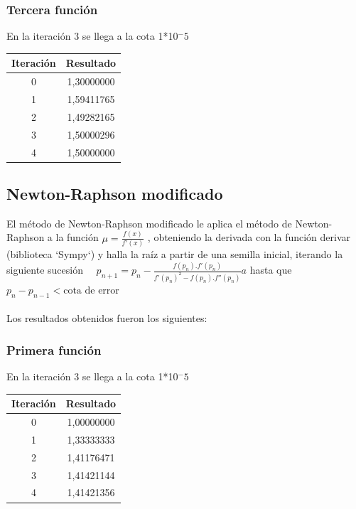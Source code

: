 \documentclass[titlepage,a4paper]{article}
\begin{document}
\subsubsection{Tercera función}\label{sec:NR3}
En la iteración 3 se llega a la cota 1*10$^-5$
\begin{center}
    \begin{tabular}{| c | c |}
    \hline
     Iteración & Resultado \\ \hline
        0     & 1,30000000 \\
        1     & 1,59411765 \\
        2     & 1,49282165 \\
        3     & 1,50000296 \\
        4     & 1,50000000 \\
    \hline
    \end{tabular}
\end{center}
\subsection{Newton-Raphson modificado}\label{sec:biseccion}

El método de Newton-Raphson modificado le aplica el método de Newton-Raphson a la función $\mu =\frac{f (x)}{f'(x)}$
, obteniendo la derivada con la función derivar (biblioteca `Sympy`) y halla la raíz a partir de una semilla inicial, iterando la siguiente sucesión
$
\quad p_{n+1}=p_n-\frac{f(p_n).f'(p_n)} {f'(p_n)^2-f(p_n).f''(p_n)}
 a$ hasta que $
p_{n}-p_{n-1} < \mbox{cota de error}
$
\\\\Los resultados obtenidos fueron los siguientes:
\subsubsection{Primera función}\label{sec:NRM1}
En la iteración 3 se llega a la cota 1*10$^-5$
\begin{center}
    \begin{tabular}{| c | c |}
    \hline
     Iteración & Resultado \\ \hline
        0     & 1,00000000 \\
        1     & 1,33333333 \\
        2     & 1,41176471 \\
        3     & 1,41421144 \\
        4     & 1,41421356 \\
    \hline
    \end{tabular}
\end{center}
\end{document}
